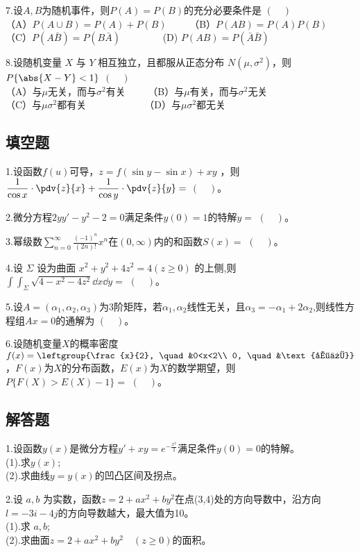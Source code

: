 7.设$A,B$为随机事件，则$P(A)=P(B)$的充分必要条件是 $(\quad)$\\
（A）$P( A \cup B)=P(A)+P(B) \qquad$  （B）$P(AB)=P(A)P(B)$\\
（C）$P(A\bar{ B })=P(B\bar{A}) \qquad \qquad$  (D) $P(AB)=P(\bar {A}\bar {B})$ 

8.设随机变量 $X$ 与 $Y$ 相互独立，且都服从正态分布 $N(\mu,\sigma ^2)$，则$P \{\abs{X-Y}<1\}$ $(\quad)$\\
（A）与$\mu$无关，而与$\sigma ^2$有关 $\qquad$（B）与$\mu$有关，而与$\sigma ^2$无关\\
（C）与$\mu \sigma ^2$都有关$\qquad \qquad \qquad$（D）与$\mu \sigma ^2$都无关



\subsection{填空题}
1.设函数$f(u)$可导，$z=f(\sin y-\sin x)+xy$ ，则 $\displaystyle \frac{1}{\cos x}\cdot \pdv{z}{x}+\frac{1}{\cos y}\cdot \pdv{z}{y}=$ $(\quad)$。

2.微分方程$2yy'-y^2-2=0$满足条件$y(0)=1$的特解$y=$ $(\quad)$。

3.幂级数$\displaystyle \sum_{n=0}^\infty \frac{(-1)^n}{(2n)!} x^n$在$(0,\infty)$内的和函数$S(x)=$ $(\quad)$。

4.设 $\Sigma$ 设为曲面 $x^2+y^2+4z^2=4 (z\ge 0)$ 的上侧,则$\int\int_{\Sigma} \sqrt{4-x^2-4z^2}\dd{x}\dd{y}=$ $(\quad)$。

5.设$A=(\alpha_1,\alpha_2,\alpha_3)$为3阶矩阵，若$\alpha_1,\alpha_2$线性无关，且$\alpha_3=-\alpha_1+2\alpha_2$,则线性方程组$Ax=0$的通解为 $(\quad)$。

6.设随机变量$X$的概率密度$f(x)=\leftgroup{\frac{x}{2}, \quad &0<x<2\\  0, \quad &\text{其他}}$ ，$F(x)$为$X$的分布函数，$E(x)$为$X$的数学期望，则$P\{F(X)>E(X)-1\}=$ $(\quad)$。


\subsection{解答题}
1.设函数$y(x)$是微分方程$y'+xy=e^{-\frac{x^2}{2}}$满足条件$y(0)=0$的特解。\\
(1).求$y(x)$;\\
(2).求曲线$y=y(x)$的凹凸区间及拐点。

2.设 $a,b$ 为实数，函数$z=2+ax^2+by^2$在点(3,4)处的方向导数中，沿方向$l=-3i-4j$的方向导数越大，最大值为10。\\
(1).求 $a,b$;\\
(2).求曲面$z=2+ax^2+by^2 \quad(z\geqslant 0)$的面积。

